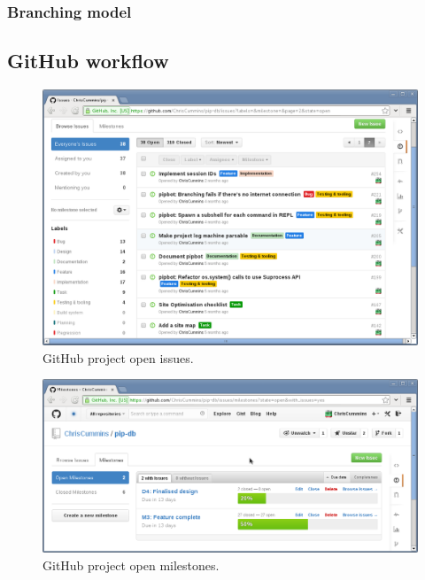 \subsubsection{Branching model}

\cite{driessen2012successful}

\subsection{GitHub workflow}





\begin{figure}[H]
\centering
    \includegraphics[width=\textwidth]{assets/github-issues}
\caption[GitHub project open issues]
        {GitHub project open issues.}
\label{fig:github-issues}
\end{figure}




\begin{figure}[H]
\centering
    \includegraphics[width=\textwidth]{assets/github-milestones}
\caption[GitHub project open milestones]
        {GitHub project open milestones.}
\label{fig:github-milestones}
\end{figure}


